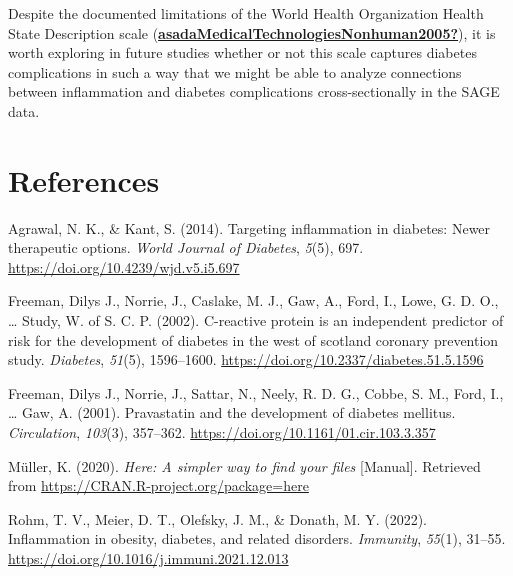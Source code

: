 \documentclass[
  man]{apa6}
\newlength{\cslhangindent}
\newlength{\cslentryspacingunit} %
\newenvironment{CSLReferences}[2] %
 {%
  \setlength{\parindent}{0pt}
  \ifodd #1
  \let\oldpar\par
  \def\par{\hangindent=\cslhangindent\oldpar}
  \fi
  \setlength{\parskip}{#2\cslentryspacingunit}
 }%
 {}
\begin{document}
Despite the documented limitations of the World Health Organization Health State Description scale (\protect\hyperlink{ref-asadaMedicalTechnologiesNonhuman2005}{\textbf{asadaMedicalTechnologiesNonhuman2005?}}), it is worth exploring in future studies whether or not this scale captures diabetes complications in such a way that we might be able to analyze connections between inflammation and diabetes complications cross-sectionally in the SAGE data.

\newpage

\hypertarget{references}{%
\section{References}\label{references}}

\hypertarget{refs}{}
\begin{CSLReferences}{1}{0}
\leavevmode{}%
Agrawal, N. K., \& Kant, S. (2014). Targeting inflammation in diabetes: {Newer} therapeutic options. \emph{World Journal of Diabetes}, \emph{5}(5), 697. \url{https://doi.org/10.4239/wjd.v5.i5.697}

\leavevmode{}%
Freeman, Dilys J., Norrie, J., Caslake, M. J., Gaw, A., Ford, I., Lowe, G. D. O., \ldots{} Study, W. of S. C. P. (2002). C-reactive protein is an independent predictor of risk for the development of diabetes in the west of scotland coronary prevention study. \emph{Diabetes}, \emph{51}(5), 1596--1600. \url{https://doi.org/10.2337/diabetes.51.5.1596}

\leavevmode{}%
Freeman, Dilys J., Norrie, J., Sattar, N., Neely, R. D. G., Cobbe, S. M., Ford, I., \ldots{} Gaw, A. (2001). Pravastatin and the development of diabetes mellitus. \emph{Circulation}, \emph{103}(3), 357--362. \url{https://doi.org/10.1161/01.cir.103.3.357}

\leavevmode{}%
Müller, K. (2020). \emph{Here: {A} simpler way to find your files} {[}Manual{]}. Retrieved from \url{https://CRAN.R-project.org/package=here}

\leavevmode{}%
Rohm, T. V., Meier, D. T., Olefsky, J. M., \& Donath, M. Y. (2022). Inflammation in obesity, diabetes, and related disorders. \emph{Immunity}, \emph{55}(1), 31--55. \url{https://doi.org/10.1016/j.immuni.2021.12.013}


\end{CSLReferences}
\end{document}
